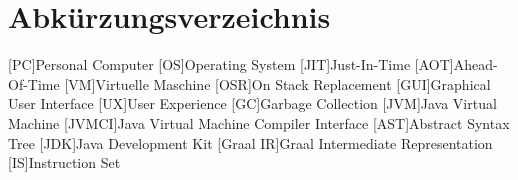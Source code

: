 \chapter*{Abkürzungsverzeichnis}
\begin{acronym}
    [PC]{Personal Computer}
    [OS]{Operating System}
    [JIT]{Just-In-Time}
    [AOT]{Ahead-Of-Time}
    [VM]{Virtuelle Maschine}
    [OSR]{On Stack Replacement}
    [GUI]{Graphical User Interface}
    [UX]{User Experience}
    [GC]{Garbage Collection}
    [JVM]{Java Virtual Machine}
    [JVMCI]{Java Virtual Machine Compiler Interface}    
    [AST]{Abstract Syntax Tree}
    [JDK]{Java Development Kit}
    [Graal IR]{Graal Intermediate Representation}
    [IS]{Instruction Set}
\end{acronym}